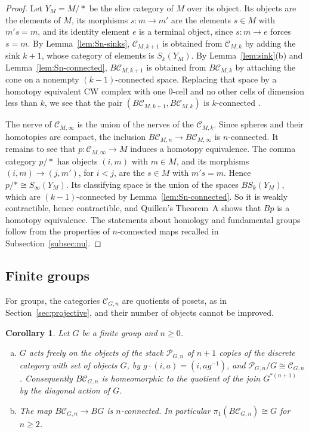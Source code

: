 \documentclass[12pt]{amsart}
\newtheorem{corollary}[teo]{Corollary}
\theoremstyle{definition}
\theoremstyle{remark}
\newcommand{\CC}{\mathcal{C}}
\newcommand{\PP}{\mathcal{P}}
\newcommand{\co}{\colon}
\begin{document}
\begin{proof}
Let $Y_M=M/{*}$ be the slice category of $M$ over its object. Its objects are the elements of $M$, its morphisms $s\co m\to m'$ are the elements $s\in M$ with $m's=m$, and its identity element $e$ is a terminal object, since $s\co m\to e$ forces $s=m$. By Lemma~\ref{lem:Sn-sinks}, $\CC_{M,k+1}$ is obtained from $\CC_{M,k}$ by adding the sink $k+1$, whose category of elements is $S_k(Y_M)$. By Lemma~\ref{lem:sink}(b) and Lemma~\ref{lem:Sn-connected}, $B\CC_{M,k+1}$ is obtained from $B\CC_{M,k}$ by attaching the cone on a nonempty $(k-1)$-connected space. Replacing that space by a homotopy equivalent CW complex with one $0$-cell and no other cells of dimension less than $k$, we see that the pair $(B\CC_{M,k+1},B\CC_{M,k})$ is $k$-connected \cite[Section~4.1]{Hatcher2002}.

The nerve of $\CC_{M,\infty}$ is the union of the nerves of the $\CC_{M,k}$. Since spheres and their homotopies are compact, the inclusion $B\CC_{M,n}\to B\CC_{M,\infty}$ is $n$-connected. It remains to see that $p\co\CC_{M,\infty}\to M$ induces a homotopy equivalence. The comma category $p/{*}$ has objects $(i,m)$ with $m\in M$, and its morphisms $(i,m)\to(j,m')$, for $i<j$, are the $s\in M$ with $m's=m$. Hence $p/{*}\cong S_\infty(Y_M)$. Its classifying space is the union of the spaces $BS_k(Y_M)$, which are $(k-1)$-connected by Lemma~\ref{lem:Sn-connected}. So it is weakly contractible, hence contractible, and Quillen's Theorem~A \cite{Quillen1973} shows that $Bp$ is a homotopy equivalence. The statements about homology and fundamental groups follow from the properties of $n$-connected maps recalled in Subsection~\ref{subsec:nu}.
\end{proof}

\subsection{Finite groups}\label{subsec:groups}

For groups, the categories $\CC_{G,n}$ are quotients of posets, as in Section~\ref{sec:projective}, and their number of objects cannot be improved.

\begin{corollary}\label{cor:groups}
Let $G$ be a finite group and $n\ge0$.
\begin{enumerate}[(a)]
\item $G$ acts freely on the objects of the stack $\PP_{G,n}$ of $n+1$ copies of the discrete category with set of objects $G$, by $g\cdot(i,a)=(i,ag^{-1})$, and $\PP_{G,n}/G\cong\CC_{G,n}$. Consequently $B\CC_{G,n}$ is homeomorphic to the quotient of the join $G^{*(n+1)}$ by the diagonal action of $G$.
\item The map $B\CC_{G,n}\to BG$ is $n$-connected. In particular $\pi_1(B\CC_{G,n})\cong G$ for $n\ge2$.
\end{enumerate}
\end{corollary}
\end{document}

